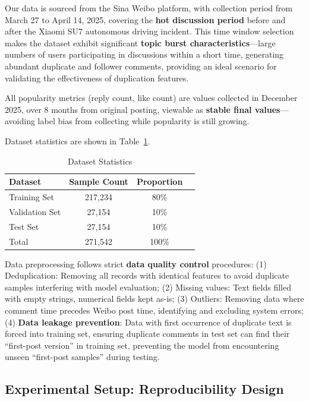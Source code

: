 \documentclass[10pt]{article}
\begin{document}
Our data is sourced from the Sina Weibo platform, with collection period from March 27 to April 14, 2025, covering the \textbf{hot discussion period} before and after the Xiaomi SU7 autonomous driving incident. This time window selection makes the dataset exhibit significant \textbf{topic burst characteristics}---large numbers of users participating in discussions within a short time, generating abundant duplicate and follower comments, providing an ideal scenario for validating the effectiveness of duplication features.

All popularity metrics (reply count, like count) are values collected in December 2025, over 8 months from original posting, viewable as \textbf{stable final values}---avoiding label bias from collecting while popularity is still growing.

Dataset statistics are shown in Table~\ref{tab:dataset}.

\begin{table}[H]
\centering
\caption{Dataset Statistics}
\label{tab:dataset}
\begin{tabular}{lccc}
\toprule
\textbf{Dataset} & \textbf{Sample Count} & \textbf{Proportion} \\
\midrule
Training Set & 217,234 & 80\% \\
Validation Set & 27,154 & 10\% \\
Test Set & 27,154 & 10\% \\
\midrule
Total & 271,542 & 100\% \\
\bottomrule
\end{tabular}
\end{table}

Data preprocessing follows strict \textbf{data quality control} procedures: (1) Deduplication: Removing all records with identical features to avoid duplicate samples interfering with model evaluation; (2) Missing values: Text fields filled with empty strings, numerical fields kept as-is; (3) Outliers: Removing data where comment time precedes Weibo post time, identifying and excluding system errors; (4) \textbf{Data leakage prevention}: Data with first occurrence of duplicate text is forced into training set, ensuring duplicate comments in test set can find their ``first-post version'' in training set, preventing the model from encountering unseen ``first-post samples'' during testing.

\subsection{Experimental Setup: Reproducibility Design}
\end{document}
